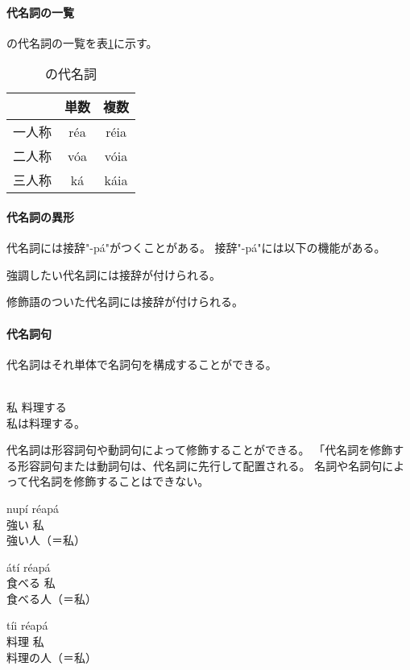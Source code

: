 \paragraph{代名詞の一覧}
\langname の代名詞の一覧を表\ref{tab:pronouns}に示す。

\begin{table}[H]
    \centering
    \begin{tabular}{lcc}
        \toprule
        & 単数 & 複数 \\
        \midrule
        一人称 & r\'ea & r\'eia \\
        二人称 & v\'oa & v\'oia \\
        三人称 & k\'a & k\'aia \\
  \bottomrule
    \end{tabular}
    \caption{\centering \langname の代名詞}
    \label{tab:pronouns}
\end{table}

\paragraph{代名詞の異形}

代名詞には接辞"-p\'a"がつくことがある。
接辞"-p\'a"には以下の機能がある。

強調したい代名詞には接辞が付けられる。

修飾語のついた代名詞には接辞が付けられる。

\paragraph{代名詞句}

代名詞はそれ単体で名詞句を構成することができる。

\begin{exe}
    \ex \gll [r\'ea] [p\'a\'a t\'ii nep\'e\'a] \\
        私 料理する \\
    \glt 私は料理する。
\end{exe}

代名詞は形容詞句や動詞句によって修飾することができる。
「代名詞を修飾する形容詞句または動詞句は、代名詞に先行して配置される。
名詞や名詞句によって代名詞を修飾することはできない。

\begin{exe}
    \ex \gll nup\'i r\'eap\'a \\
        強い 私 \\
    \glt 強い人（＝私）
\end{exe}
\begin{exe}
    \ex \gll \'at\'i r\'eap\'a \\
        食べる 私 \\
    \glt 食べる人（＝私）
\end{exe}
\begin{exe}
    \ex \gll *t\'ii r\'eap\'a \\
        料理 私 \\
    \glt 料理の人（＝私）
\end{exe}
